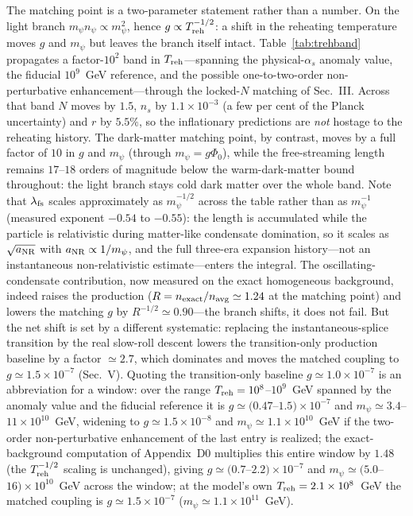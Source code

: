 \documentclass[pdflatex,sn-mathphys-num]{sn-jnl}
\newcommand{\PhiV}{\Phi_0}
\theoremstyle{thmstyleone}
\begin{document}
The matching point is a two-parameter statement rather than a number. On the light branch $m_\psi n_\psi\propto m_\psi^{2}$, hence $g\propto T_{\rm reh}^{-1/2}$: a shift in the reheating temperature moves $g$ and $m_\psi$ but leaves the branch itself intact. Table~\ref{tab:trehband} propagates a factor-$10^{2}$ band in $T_{\rm reh}$---spanning the physical-$\alpha_s$ anomaly value, the fiducial $10^{9}$~GeV reference, and the possible one-to-two-order non-perturbative enhancement---through the locked-$N$ matching of Sec.~III. Across that band $N$ moves by $1.5$, $n_s$ by $1.1\times10^{-3}$ (a few per cent of the Planck uncertainty) and $r$ by $5.5\%$, so the inflationary predictions are \emph{not} hostage to the reheating history. The dark-matter matching point, by contrast, moves by a full factor of $10$ in $g$ and $m_\psi$ (through $m_\psi=g\PhiV$), while the free-streaming length remains $17$--$18$ orders of magnitude below the warm-dark-matter bound throughout: the light branch stays cold dark matter over the whole band. Note that $\lambda_{\rm fs}$ scales approximately as $m_\psi^{-1/2}$ across the table rather than as $m_\psi^{-1}$ (measured exponent $-0.54$ to $-0.55$): the length is accumulated while the particle is relativistic during matter-like condensate domination, so it scales as $\sqrt{a_{\rm NR}}$ with $a_{\rm NR}\propto1/m_\psi$, and the full three-era expansion history---not an instantaneous non-relativistic estimate---enters the integral. The oscillating-condensate contribution, now measured on the exact homogeneous background, indeed raises the production ($R=n_{\rm exact}/n_{\rm avg}\simeq1.24$ at the matching point) and lowers the matching $g$ by $R^{-1/2}\simeq0.90$---the branch shifts, it does not fail. But the net shift is set by a different systematic: replacing the instantaneous-splice transition by the real slow-roll descent lowers the transition-only production baseline by a factor $\simeq2.7$, which dominates and moves the matched coupling to $g\simeq1.5\times10^{-7}$ (Sec.~V). Quoting the transition-only baseline $g\simeq1.0\times10^{-7}$ is an abbreviation for a window: over the range $T_{\rm reh}=10^{8}$--$10^{9}$~GeV spanned by the anomaly value and the fiducial reference it is $g\simeq(0.47$--$1.5)\times10^{-7}$ and $m_\psi\simeq3.4$--$11\times10^{10}$~GeV, widening to $g\simeq1.5\times10^{-8}$ and $m_\psi\simeq1.1\times10^{10}$~GeV if the two-order non-perturbative enhancement of the last entry is realized; the exact-background computation of Appendix~D0 multiplies this entire window by $1.48$ (the $T_{\rm reh}^{-1/2}$ scaling is unchanged), giving $g\simeq(0.7$--$2.2)\times10^{-7}$ and $m_\psi\simeq(5.0$--$16)\times10^{10}$~GeV across the window; at the model's own $T_{\rm reh}=2.1\times10^{8}$~GeV the matched coupling is $g\simeq1.5\times10^{-7}$ ($m_\psi\simeq1.1\times10^{11}$~GeV).
\end{document}
